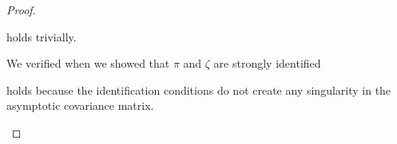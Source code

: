 \documentclass[11pt, letterpaper, twoside, final]{article}
\begin{document}
\begin{appendices}
\begin{proof}
\begin{proofpart}
    \label{mainTheoremProofPart4}
   
     holds trivially.

    We verified  when we showed that $\pi$ and $\zeta$ are strongly identified

     holds because the identification conditions do not create any singularity in the
    asymptotic covariance matrix. 

\end{proofpart}

\end{proof}





\end{appendices}
\end{document}
